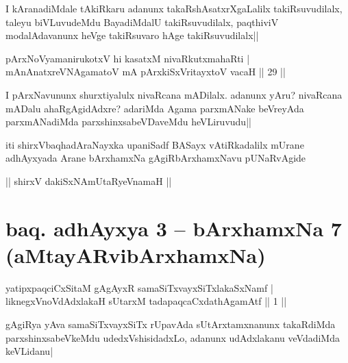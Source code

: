 \begin{artha}%
I kAranadiMdale tAkiRkaru adanunx takaRshAsatxrXgaLalilx takiRsuvudilalx, taleyu biVLuvudeMdu BayadiMdalU takiRsuvudilalx, paqthiviV modalAdavanunx heVge takiRsuvaro hAge takiRsuvudilalx||
\end{artha}

\begin{shl}
pArxNoV\s yamanirukotxV hi kasatxM nivaRkutxmahaRti |\\
mAnAnatxreVNA\s \s gamatoV mA pArxkiSxVritayxtoV vacaH \hfill || 29 ||
\end{shl}

\begin{artha}
I pArxNavununx shurxtiyalulx nivaRcana mADilalx. adanunx yAru? nivaRcana mADalu ahaRgAgidAdxre? adariMda Agama parxmANake beVreyAda parxmANadiMda parxshinxsabeVDaveMdu heVLiruvudu||
\end{artha}

\begin{center}
iti shirxVbaqhadAraNayxka upaniSadf BASayx vAtiRkadalilx mUrane adhAyxyada Arane bArxhamxNa gAgiRbArxhamxNavu pUNaRvAgide
\end{center}

\begin{center}%
|| shirxV dakiSxNAmUtaRyeVnamaH ||
\end{center}

\section*{baq. adhAyxya 3 -- bArxhamxNa 7 (aMtayARvibArxhamxNa)}

\begin{shl}
yatipxpaqciCxSitaM gAgAyxR samaSiTxvayxSiTxlakaSxNamf |\\
liknegxVnoVdAdxlakaH sUtarxM tadapaqcaCxdathA\s \s gamAtf \hfill || 1 ||
\end{shl}

\begin{artha}
gAgiRya yAva samaSiTxvayxSiTx rUpavAda sUtArxtamxnanunx takaRdiMda parxshinxsabeVkeMdu udedxVshisidadxLo, adanunx udAdxlakanu veVdadiMda keVLidanu|
\end{artha}

